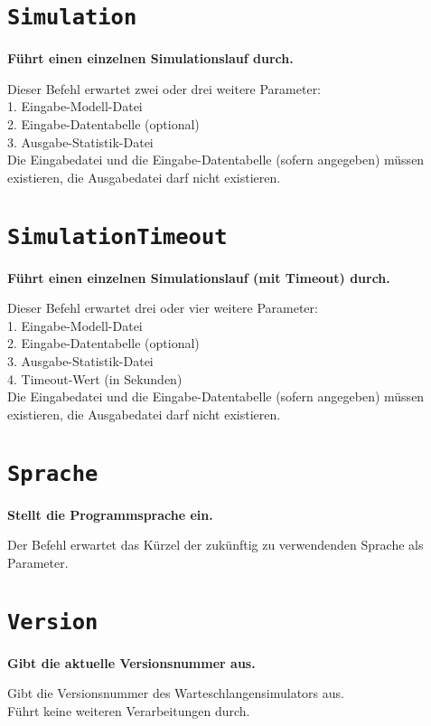\section{\texttt{Simulation}}

\textbf{Führt einen einzelnen Simulationslauf durch.}

Dieser Befehl erwartet zwei oder drei weitere Parameter:\\
1. Eingabe-Modell-Datei\\
2. Eingabe-Datentabelle (optional)\\
3. Ausgabe-Statistik-Datei\\
Die Eingabedatei und die Eingabe-Datentabelle (sofern angegeben) müssen existieren, die Ausgabedatei darf nicht existieren.

\section{\texttt{SimulationTimeout}}

\textbf{Führt einen einzelnen Simulationslauf (mit Timeout) durch.}

Dieser Befehl erwartet drei oder vier weitere Parameter:\\
1. Eingabe-Modell-Datei\\
2. Eingabe-Datentabelle (optional)\\
3. Ausgabe-Statistik-Datei\\
4. Timeout-Wert (in Sekunden)\\
Die Eingabedatei und die Eingabe-Datentabelle (sofern angegeben) müssen existieren, die Ausgabedatei darf nicht existieren.

\section{\texttt{Sprache}}

\textbf{Stellt die Programmsprache ein.}

Der Befehl erwartet das Kürzel der zukünftig zu verwendenden Sprache als Parameter.

\section{\texttt{Version}}

\textbf{Gibt die aktuelle Versionsnummer aus.}

Gibt die Versionsnummer des Warteschlangensimulators aus.\\
Führt keine weiteren Verarbeitungen durch.

